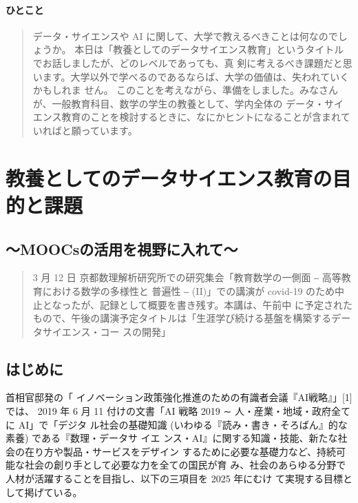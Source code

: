 \documentclass[
]{book}
\theoremstyle{definition}
\theoremstyle{definition}
\theoremstyle{definition}
\theoremstyle{definition}
\theoremstyle{remark}
\begin{document}
\hypertarget{ux3072ux3068ux3053ux3068}{%
\subsubsection{ひとこと}\label{ux3072ux3068ux3053ux3068}}

\begin{quote}
データ・サイエンスや AI に関して、大学で教えるべきことは何なのでしょうか。 本日は「教養としてのデータサイエンス教育」というタイトルでお話しましたが、どのレベルであっても、真
剣に考えるべき課題だと思います。大学以外で学べるのであるならば、大学の価値は、失われていくかもしれま
せん。
このことを考えながら、準備をしました。みなさんが、一般教育科目、数学の学生の教養として、学内全体の データ・サイエンス教育のことを検討するときに、なにかヒントになることが含まれていればと願っています。
\end{quote}

\hypertarget{math2020}{%
\chapter{教養としてのデータサイエンス教育の目的と課題}\label{math2020}}

\hypertarget{moocsux306eux6d3bux7528ux3092ux8996ux91ceux306bux5165ux308cux3066-1}{%
\section*{～MOOCsの活用を視野に入れて～}\label{moocsux306eux6d3bux7528ux3092ux8996ux91ceux306bux5165ux308cux3066-1}}

\begin{quote}
3 月 12 日 京都数理解析研究所での研究集会「教育数学の一側面 ‒ 高等教育における数学の多様性と 普遍性 ‒ (II)」での講演が covid-19 のため中止となったが、記録として概要を書き残す。本講は、午前中 に予定されたもので、午後の講演予定タイトルは「生涯学び続ける基盤を構築するデータサイエンス・コー スの開発」
\end{quote}

\hypertarget{ux306fux3058ux3081ux306b-1}{%
\section{はじめに}\label{ux306fux3058ux3081ux306b-1}}

首相官邸発の「 イノベーション政策強化推進のための有識者会議『AI戦略』」{[}1{]} では、 2019 年 6 月 11 付けの文書「AI 戦略 2019 ∼ 人・産業・地域・政府全てに AI」で「デジタ ル社会の基礎知識 (いわゆる『読み・書き・そろばん』的な素養) である『数理・データサ イエ ンス・AI』に関する知識・技能、新たな社会の在り方や製品・サービスをデザイン するために必要な基礎力など、持続可能な社会の創り手として必要な力を全ての国民が育 み、社会のあらゆる分野で人材が活躍することを目指し、以下の三項目を 2025 年にむけ て実現する目標として掲げている。
\end{document}

